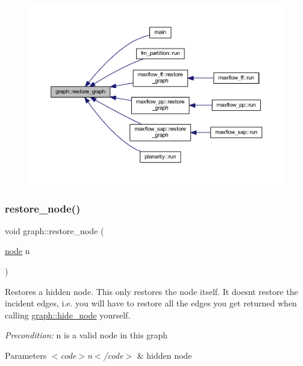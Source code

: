 \begin{figure}[H]
\begin{center}
\leavevmode
\includegraphics[width=350pt]{classgraph_a53e2a5505fa6427587e12d66e4a86cec_icgraph}
\end{center}
\end{figure}
\mbox{\label{classgraph_ab57aab79e649cc275052b7decbdd03ec}} 
\subsubsection{\texorpdfstring{restore\+\_\+node()}{restore\_node()}}
{\footnotesize\ttfamily void graph\+::restore\+\_\+node (\begin{DoxyParamCaption}\item[{\mbox{\hyperlink{classnode}{node}}}]{n }\end{DoxyParamCaption})}

Restores a hidden node. This only restores the node itself. It doesn\textquotesingle{}t restore the incident edges, i.\+e. you will have to restore all the edges you get returned when calling \mbox{\hyperlink{classgraph_a214618b5e3c02695779350532506e225}{graph\+::hide\+\_\+node}} yourself. ~\newline
 

{\itshape Precondition\+:} {\ttfamily n} is a valid node in this graph 
\begin{DoxyParams}{Parameters}
{\em $<$code$>$n$<$/code$>$} & hidden node \\
\hline
\end{DoxyParams}


